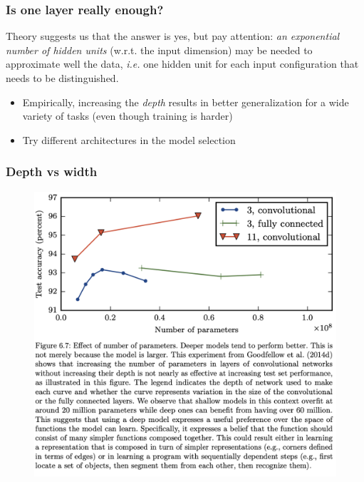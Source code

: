 \documentclass{beamer}
\begin{document}
\begin{frame}
	\frametitle{Is one layer really enough?}
	Theory suggests us that the answer is yes, but pay attention: \textit{an exponential number of hidden units} (w.r.t. the input dimension) may be needed to approximate well the data, \textit{i.e.} one hidden unit for each input configuration that needs to be distinguished.
	
	\vspace{5mm}
	\begin{itemize}
		\item Empirically, increasing the \textit{depth} results in better generalization for a wide variety of tasks (even though training is harder)
		\item Try different architectures in the model selection
	\end{itemize}
	
\end{frame}

\begin{frame}
	\frametitle{Depth vs width}
\begin{figure}
	\centering
	\includegraphics[width=0.8\linewidth]{images/depth}
	\label{fig:depth}
\end{figure}
\end{frame}
\end{document}
